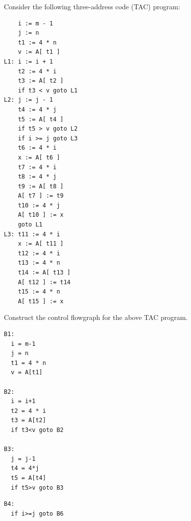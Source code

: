\documentclass[12pt]{article}
\begin{document}
\begin{exe}

  
\newpage

\ex\label{opt} Consider the following three-address code (TAC) program:

  \begin{verbatim}
    i := m - 1
    j := n
    t1 := 4 * n
    v := A[ t1 ]
L1: i := i + 1
    t2 := 4 * i
    t3 := A[ t2 ]
    if t3 < v goto L1
L2: j := j - 1
    t4 := 4 * j
    t5 := A[ t4 ]
    if t5 > v goto L2
    if i >= j goto L3
    t6 := 4 * i
    x := A[ t6 ]
    t7 := 4 * i
    t8 := 4 * j
    t9 := A[ t8 ]
    A[ t7 ] := t9
    t10 := 4 * j
    A[ t10 ] := x
    goto L1
L3: t11 := 4 * i
    x := A[ t11 ]
    t12 := 4 * i
    t13 := 4 * n
    t14 := A[ t13 ]
    A[ t12 ] := t14
    t15 := 4 * n
    A[ t15 ] := x
  \end{verbatim}

  \begin{xlist}

    {\ex\label{flowgraph} Construct the control flowgraph for the above TAC program.
    \begin{soln}
	
	\begin{minipage}[t]{1.5in}
	{\small
    \begin{verbatim}
B1:    
  i = m-1
  j = n
  t1 = 4 * n
  v = A[t1]

B2: 
  i = i+1
  t2 = 4 * i
  t3 = A[t2]
  if t3<v goto B2

B3:
  j = j-1
  t4 = 4*j
  t5 = A[t4]
  if t5>v goto B3
    \end{verbatim}
    }
    \end{minipage}
	\begin{minipage}[t]{1.5in}
    {\small
    \begin{verbatim}
B4:
  if i>=j goto B6


\end{verbatim}}
\end{minipage}
\end{soln}}
\end{xlist}
\end{exe}
\end{document}
